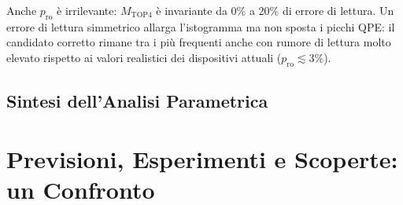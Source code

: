 \begin{onehalfspace}
Anche $p_{\text{ro}}$ è irrilevante: $M_{\text{TOP4}}$ è invariante da 0\% a 20\% di errore di lettura. Un errore di lettura simmetrico allarga l'istogramma ma non sposta i picchi QPE: il candidato corretto rimane tra i più frequenti anche con rumore di lettura molto elevato rispetto ai valori realistici dei dispositivi attuali ($p_{\text{ro}} \lesssim 3\%$).

\subsection{Sintesi dell'Analisi Parametrica}
\label{subsec:sintesi_parametri}

\begin{table}[H]
\centering
\caption{Gerarchia dei parametri di mitigazione: impatto osservato e raccomandazioni operative}
\label{tab:sintesi_parametri}
\end{table}

\section{Previsioni, Esperimenti e Scoperte: un Confronto}
\label{sec:previsioni_scoperte}


\end{onehalfspace}
